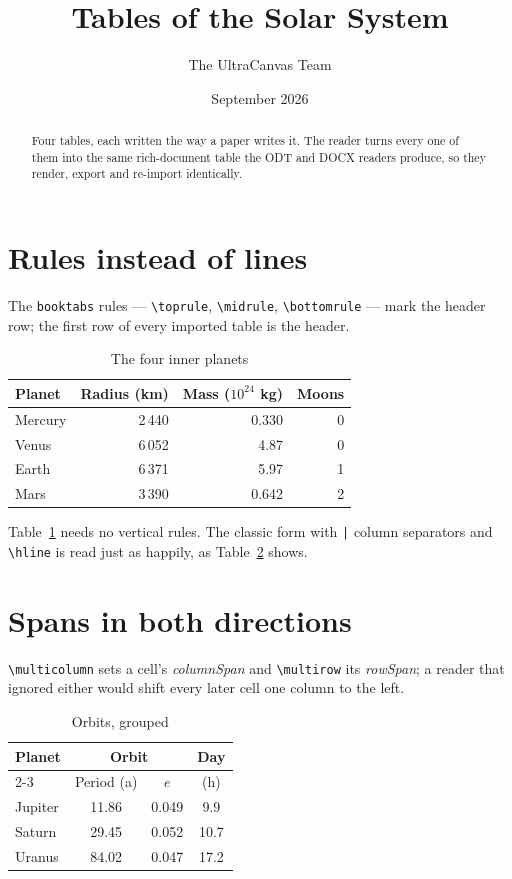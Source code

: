 \documentclass[11pt]{article}
\title{Tables of the Solar System}
\author{The UltraCanvas Team}
\date{September 2026}
\begin{document}
\maketitle

\begin{abstract}
Four tables, each written the way a paper writes it. The reader turns every
one of them into the same rich-document table the ODT and DOCX readers
produce, so they render, export and re-import identically.
\end{abstract}

\section{Rules instead of lines}
The \texttt{booktabs} rules --- \texttt{\textbackslash toprule},
\texttt{\textbackslash midrule}, \texttt{\textbackslash bottomrule} --- mark
the header row; the first row of every imported table is the header.

\begin{table}[h]
  \centering
  \caption{The four inner planets}\label{tab:inner}
  \begin{tabular}{lrrr}
    \toprule
    Planet & Radius (km) & Mass ($10^{24}$ kg) & Moons \\
    \midrule
    Mercury & 2\,440 & 0.330 & 0 \\
    Venus   & 6\,052 & 4.87  & 0 \\
    Earth   & 6\,371 & 5.97  & 1 \\
    Mars    & 3\,390 & 0.642 & 2 \\
    \bottomrule
  \end{tabular}
\end{table}

Table~\ref{tab:inner} needs no vertical rules. The classic form with
\texttt{|} column separators and \texttt{\textbackslash hline} is read just
as happily, as Table~\ref{tab:spans} shows.

\section{Spans in both directions}
\texttt{\textbackslash multicolumn} sets a cell's \emph{columnSpan} and
\texttt{\textbackslash multirow} its \emph{rowSpan}; a reader that ignored
either would shift every later cell one column to the left.

\begin{table}[h]
  \centering
  \caption{Orbits, grouped}\label{tab:spans}
  \begin{tabular}{|l|c|c|c|}
    \hline
    \multirow{2}{*}{Planet} & \multicolumn{2}{c|}{Orbit} & Day \\ \cline{2-3}
     & Period (a) & $e$ & (h) \\ \hline
    Jupiter & 11.86 & 0.049 & 9.9 \\ \hline
    Saturn  & 29.45 & 0.052 & 10.7 \\ \hline
    Uranus  & 84.02 & 0.047 & 17.2 \\ \hline
  \end{tabular}
\end{table}
\end{document}
